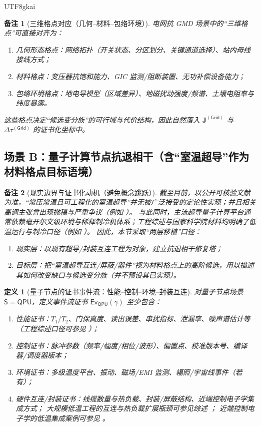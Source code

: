 \documentclass[12pt]{article}
\newtheorem{definition}{定义}[section]
\newtheorem{remark}{备注}[section]
\begin{document}
\begin{CJK*}{UTF8}{gkai}
\begin{remark}[三维格点对应（几何--材料--包络环境）]
电网抗 GMD 场景中的“三维格点”可直接对齐为：
\begin{enumerate}
  \item 几何形态格点：网络拓扑（开关状态、分区划分、关键通道选择）、站内母线接线方式；
  \item 材料格点：变压器抗饱和能力、GIC 监测/阻断装置、无功补偿设备能力；
  \item 包络环境格点：地电导模型（区域差异）、地磁扰动强度/频谱、土壤电阻率与纬度暴露。
\end{enumerate}
这些格点决定“候选变分族”的可行域与代价结构，因此自然落入 $\mathbf{J}^{(\mathsf{Grid})}$ 与 $\Delta\tau^{(\mathsf{Grid})}$ 的证书化坐标中。
\end{remark}

\subsection{场景 B：量子计算节点抗退相干（含“室温超导”作为材料格点目标语境）}
\label{sec:migration-qpu-decoherence}

\begin{remark}[现实边界与证书化动机（避免概念跳跃）]
截至目前，以公开可核验文献为准，“常压常温且可工程化的室温超导”并无被广泛接受的定论性实现；并且相关高调主张曾出现撤稿与严重争议（例如 \cite{ref_nature_2022_05294_9}）。
与此同时，主流超导量子计算平台通常依赖毫开尔文级环境与稀释制冷机体系；工程综述与国家科学院材料均明确了低温运行与制冷口径（例如 \cite{ref_aip_apr_superconducting_qubits,
  ref_nationalacademies_25196_ch13}）。
因此，本节采取“两层移植”口径：
\begin{enumerate}
  \item 现实层：以现有超导/封装互连工程为对象，建立抗退相干修复塔；
  \item 目标层：把“室温超导互连/屏蔽/器件”视为材料格点上的高阶候选，用以描述其如何改变缺口与候选变分族（并不预设其已实现）。
\end{enumerate}
\end{remark}

\begin{definition}[量子节点的证书事件流：性能--控制--环境--封装互连]
\label{def:qpu-eventstream}
对量子节点场景 $\mathsf{S}=\mathsf{QPU}$，定义事件流证书 $\mathsf{Ev}_{\mathsf{QPU}}(\gamma)$ 至少包含：
\begin{enumerate}
  \item 性能证书：$T_1/T_2$、门保真度、读出误差、串扰指标、泄漏率、噪声谱估计等（工程综述口径可参见 \cite{ref_aip_apr_superconducting_qubits}）；
  \item 控制证书：脉冲参数（频率/幅度/相位/波形）、偏置点、校准版本号、编译器/调度器版本；
  \item 环境证书：多级温度平台、振动、磁场/EMI 监测、辐照/宇宙线事件（若有）；
  \item 硬件互连/封装证书：线缆数量与热负载、封装/屏蔽结构、近端控制电子学集成方式；
  大规模低温工程的互连与热负载扩展瓶颈可参见综述 \cite{ref_springer_epjqt_2019_0072_0}；
  近端控制电子学的低温集成案例可参见 \cite{ref_nature_2025_09157_x}。
\end{enumerate}
\end{definition}


\end{CJK*}
\end{document}
